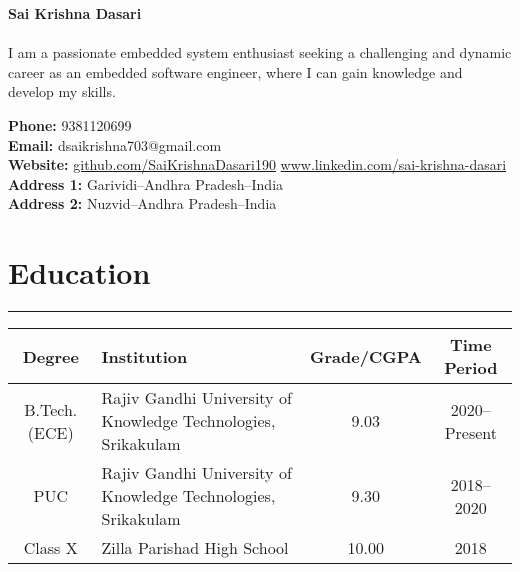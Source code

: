 \documentclass[10pt]{article}
\renewcommand{\arraystretch}{1.5}
\begin{document}
\begin{multicols}{2}
{\LARGE \textbf{Sai Krishna Dasari\\\\}}
I am a passionate embedded system enthusiast seeking a challenging and dynamic career as an embedded software engineer, where I can gain knowledge and develop my skills.

\columnbreak
\begin{flushright}
\textbf{Phone:} 9381120699\\
\textbf{Email:} dsaikrishna703@gmail.com \\
 \textbf{Website: }\href{https://github.com/SaiKrishnaDasari190}{github.com/SaiKrishnaDasari190}
 \href{https://www.linkedin.com/in/sai-krishna-dasari-694381191/}{www.linkedin.com/sai-krishna-dasari}\\
 \textbf{Address 1: }Garividi–Andhra Pradesh–India\\
\textbf{Address 2: }Nuzvid–Andhra Pradesh–India
\end{flushright}
\end{multicols}

\section*{Education}
\hrule
\begin{table}[h]
  \setlength{\tabcolsep}{5pt} %
  \renewcommand{\arraystretch}{1.5} %
  \begin{tabularx}{\textwidth}{|c|X|c|c|}
    \hline
    \textbf{Degree} &\centering\textbf{ Institution}&\textbf{Grade/CGPA}&\textbf{Time Period}\\
    \hline
    B.Tech. (ECE) & Rajiv Gandhi University of Knowledge \centering Technologies, Srikakulam & 9.03 & 2020--Present \\
    \hline
    PUC & Rajiv Gandhi University of Knowledge \centering Technologies, Srikakulam & 9.30 & 2018--2020 \\
    \hline
    Class X &\centering Zilla Parishad High School & 10.00 & 2018 \\
    \hline
  \end{tabularx}
\end{table}

\end{document}
